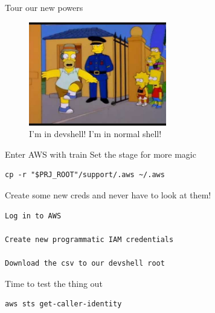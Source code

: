 \documentclass[bigger]{beamer}
\begin{document}
\begin{frame}[label={sec:org9615ab6}]{Tour our new powers}
\begin{figure}[htbp]
\centering
\includegraphics[width=6cm]{homer.jpg}
\caption{I'm in devshell! I'm in normal shell!}
\end{figure}
\end{frame}
\begin{frame}[label={sec:org4c897dc},fragile]{Enter AWS with train}
 Set the stage for more magic
\begin{verbatim}
cp -r "$PRJ_ROOT"/support/.aws ~/.aws
\end{verbatim}
Create some new creds and never have to look at them!
\begin{verbatim}
Log in to AWS

Create new programmatic IAM credentials

Download the csv to our devshell root
\end{verbatim}
\end{frame}
\begin{frame}[label={sec:org222d06c},fragile]{Time to test the thing out}
 \begin{verbatim}
aws sts get-caller-identity
\end{verbatim}
\end{frame}
\end{document}
